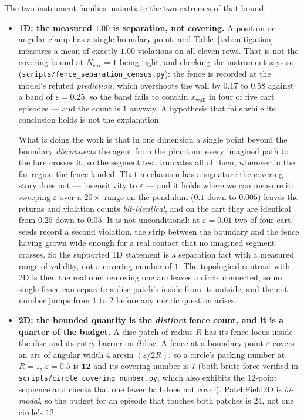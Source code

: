 \documentclass[11pt]{article}
\theoremstyle{definition}
\theoremstyle{remark}
\begin{document}
The two instrument families instantiate the two extremes of that bound.
\begin{itemize}
\item \textbf{1D: the measured $1.00$ is separation, not covering.} A position or angular clamp has a single boundary point, and Table~\ref{tab:mitigation} measures a mean of exactly $1.00$ violations on all eleven rows. That is not the covering bound at $N_{\mathrm{cov}} = 1$ being tight, and checking the instrument says so (\texttt{scripts/\allowbreak fence\_\allowbreak separation\_\allowbreak census.py}): the fence is recorded at the model's refuted \emph{prediction}, which overshoots the wall by $0.17$ to $0.58$ against a band of $\varepsilon = 0.25$, so the band fails to contain $x_\mathrm{wall}$ in four of five cart episodes --- and the count is $1$ anyway. A hypothesis that fails while its conclusion holds is not the explanation.

  What is doing the work is that in one dimension a single point beyond the boundary \emph{disconnects} the agent from the phantom: every imagined path to the lure crosses it, so the segment test truncates all of them, wherever in the far region the fence landed. That mechanism has a signature the covering story does not --- insensitivity to $\varepsilon$ --- and it holds where we can measure it: sweeping $\varepsilon$ over a $20\times$ range on the pendulum ($0.1$ down to $0.005$) leaves the returns and violation counts \emph{bit-identical}, and on the cart they are identical from $0.25$ down to $0.05$. It is not unconditional: at $\varepsilon = 0.01$ two of four cart seeds record a second violation, the strip between the boundary and the fence having grown wide enough for a real contact that no imagined segment crosses. So the supported 1D statement is a separation fact with a measured range of validity, not a covering number of $1$. The topological contrast with 2D is then the real one: removing one arc leaves a circle connected, so no single fence can separate a disc patch's inside from its outside, and the cut number jumps from $1$ to $2$ before any metric question arises.
\item \textbf{2D: the bounded quantity is the \emph{distinct} fence count, and it is a quarter of the budget.} A disc patch of radius $R$ has its fence locus inside the disc and its entry barrier on $\partial\,\mathrm{disc}$. A fence at a boundary point $\varepsilon$-covers an arc of angular width $4\arcsin(\varepsilon/2R)$, so a circle's packing number at $R = 1$, $\varepsilon = 0.5$ is $\mathbf{12}$ and its covering number is $7$ (both brute-force verified in \texttt{scripts/\allowbreak circle\_\allowbreak covering\_\allowbreak number.py}, which also exhibits the 12-point sequence and checks that one fewer ball does not cover). PatchField2D is \emph{bi-modal}, so the budget for an episode that touches both patches is $24$, not one circle's $12$.


\end{itemize}
\end{document}
